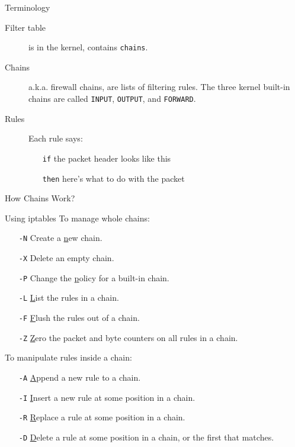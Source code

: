 \begin{frame}{Terminology}
  \begin{description}
  \item[Filter table] is in the kernel, contains \texttt{chains}.
  \item[Chains] a.k.a. firewall chains, are lists of filtering rules. The three kernel
    built-in chains are called \texttt{INPUT}, \texttt{OUTPUT}, and \texttt{FORWARD}.
  \item[Rules] Each rule says:
    \begin{itemize}
    \item[\texttt{if}] the packet header looks like this
    \item[\texttt{then}] here's what to do with the packet
    \end{itemize}
  \end{description}
\end{frame}

\begin{frame}{How Chains Work?}
  \centering
\end{frame}

\begin{frame}{Using iptables}
  To manage whole chains:
  \begin{itemize}
  \item[\texttt{-N}] Create a \underline{n}ew chain.
  \item[\texttt{-X}] Delete an empty chain.
  \item[\texttt{-P}] Change the \underline{p}olicy for a built-in chain.
  \item[\texttt{-L}] \underline{L}ist the rules in a chain.
  \item[\texttt{-F}] \underline{F}lush the rules out of a chain.
  \item[\texttt{-Z}] \underline{Z}ero the packet and byte counters on all rules in a chain.
  \end{itemize}
  To manipulate rules inside a chain:
  \begin{itemize}
  \item[\texttt{-A}] \underline{A}ppend a new rule to a chain.
  \item[\texttt{-I}] \underline{I}nsert a new rule at some position in a chain.
  \item[\texttt{-R}] \underline{R}eplace a rule at some position in a chain.
  \item[\texttt{-D}] \underline{D}elete a rule at some position in a chain, or the first that matches.
  \end{itemize}
\end{frame}

